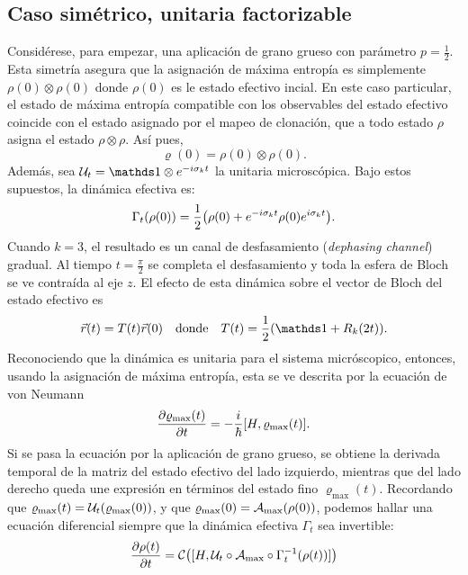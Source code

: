 \subsection{Caso simétrico, unitaria factorizable}
Considérese, para empezar, una aplicación de grano grueso con parámetro $p=\frac{1}{2}$. Esta simetría asegura que la asignación de máxima entropía es simplemente $\rho(0)\otimes\rho(0)$ donde $\rho(0)$ es le estado efectivo incial. En este caso particular, el estado de máxima entropía compatible con los observables del estado efectivo coincide con el estado asignado por el mapeo de clonación, que a todo estado $\rho$ asigna el estado $\rho\otimes\rho$. Así pues,
\begin{equation*}
    \varrho(0)=\rho(0)\otimes\rho(0).
\end{equation*}
Además, sea $\mcU_{t}=\Id\otimes e^{-i\pauli{k}t}$ la unitaria microscópica. Bajo estos supuestos, la dinámica efectiva es:
\begin{equation*}
    \Gamma_{t}(\rho(0))=\frac{1}{2}\qty(\rho(0)+e^{-i\sigma_{k}t}\rho(0)e^{i\sigma_{k}t}).
\end{equation*}
Cuando $k=3$, el resultado es un canal de desfasamiento (\textit{dephasing channel}) gradual. Al tiempo $t=\frac{\pi}{2}$ se completa el desfasamiento y toda la esfera de Bloch se ve contraída al eje $z$. El efecto de esta dinámica sobre el vector de Bloch del estado efectivo es
\begin{align*}
    \vec{r}(t)=T(t)\vec{r}(0) & & \text{donde} & & T(t)=\frac{1}{2}(\Id+R_{k}(2t)).
\end{align*}
Reconociendo que la dinámica es unitaria para el sistema micróscopico, entonces, usando la asignación de máxima entropía, esta se ve descrita por la ecuación de von Neumann
\begin{equation*}
    \frac{\partial \varrho_{\max}(t)}{\partial t}=-\frac{i}{\hbar}\qty[H,\varrho_{\max}(t)].
\end{equation*}
Si se pasa la ecuación por la aplicación de grano grueso, se obtiene la derivada temporal de la matriz del estado efectivo del lado izquierdo, mientras que del lado derecho queda une expresión en términos del estado fino $\varrho_{\max}(t)$. Recordando que $\varrho_{\max}(t)=\mathcal{U}_{t}(\varrho_{\max}(0))$, y que $\varrho_{\max}(0)=\mathcal{A}_{\max}(\rho(0))$, podemos hallar una ecuación diferencial siempre que la dinámica efectiva $\Gamma_{t}$ sea invertible:
\begin{equation*}
    \frac{\partial \rho(t)}{\partial t}=\mathcal{C}\qty([H,\mathcal{U}_{t}\circ\mathcal{A}_{\max}\circ\Gamma_{t}^{-1}(\rho(t))])
\end{equation*}

